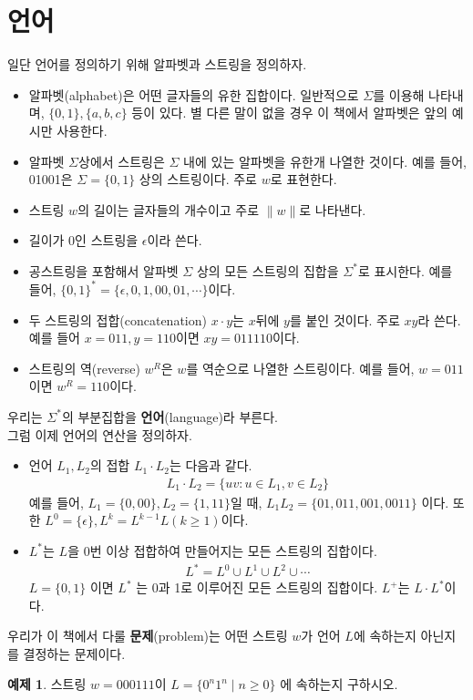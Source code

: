 \documentclass[b5paper, 10pt]{book}
\theoremstyle{definition}
\newtheorem{ex}[defn]{예제}
\begin{document}
\section{언어}
일단 언어를 정의하기 위해 알파벳과 스트링을 정의하자.
\begin{itemize}
    \item 알파벳(alphabet)은 어떤 글자들의 유한 집합이다. 일반적으로
    $\Sigma$를 이용해 나타내며, $\{0, 1\}, \{a, b, c\}$ 등이 있다. 별 다른
    말이 없을 경우 이 책에서 알파벳은 앞의 예시만 사용한다. 
    \item 알파벳 $\Sigma$상에서 스트링은 $\Sigma$ 내에 있는 알파벳을 유한개
    나열한 것이다. 예를 들어, 01001은 $\Sigma = \{0, 1\}$ 상의 스트링이다.
    주로 $w$로 표현한다.
    \item 스트링 $w$의 길이는 글자들의 개수이고 주로 $\| w \|$로 나타낸다.
    \item 길이가 0인 스트링을 $\epsilon$이라 쓴다. 
    \item 공스트링을 포함해서 알파벳 $\Sigma$ 상의 모든 스트링의 집합을
    $\Sigma^*$로 표시한다. 예를 들어, $\{0, 1\}^{*} = \{\epsilon, 0, 1, 00, 01 , \cdots \}$이다.
    \item 두 스트링의 접합(concatenation) $x \cdot y$는 $x$뒤에 $y$를 붙인 것이다.
    주로 $xy$라 쓴다. 예를 들어 $x = 011, y = 110$이면 $xy = 011110$이다. 
    \item 스트링의 역(reverse) $w^R$은 $w$를 역순으로 나열한 스트링이다. 
    예를 들어, $w=011$이면
    $w^R=110$이다.
\end{itemize}
우리는 $\Sigma^*$의 부분집합을 \textbf{언어}(language)라 부른다.\\ 
그럼 이제 언어의 연산을 정의하자.
\begin{itemize}
    \item 언어 $L_1, L_2$의 접합 $L_1 \cdot L_2$는 다음과 같다.
    \begin{align*}
       L_1 \cdot L_2 = \{uv: u \in L_1, v \in L_2\} 
    \end{align*}
    예를 들어, $L_1 = \{0, 00\}, L_2 = \{1, 11\}$일 때,
    $L_1 L_2 = \{01, 011, 001, 0011\}$ 이다. 또한
    $L^0 = \{ \epsilon\}, L^{k} = L^{k-1} L (k \ge 1)$이다.  
    \item $L^*$는 $L$을 0번 이상 접합하여 만들어지는 모든 스트링의 집합이다.
    \begin{align*}
        L^* = L^0 \cup L^1 \cup L^2 \cup \cdots 
    \end{align*}
    $L = \{0, 1\}$ 이면 $L^*$ 는 0과 1로 이루어진 모든 스트링의 집합이다. $L^+$는 
    $L \cdot L^*$이다.
\end{itemize}
우리가 이 책에서 다룰 \textbf{문제}(problem)는 어떤 스트링 $w$가 언어 $L$에 속하는지
아닌지를 결정하는 문제이다.
\begin{ex}
    스트링 $w = 000111$이 $L = \{0^n 1^n \;\vert\; n \ge 0\}$ 에 속하는지
구하시오.
\end{ex}
\end{document}
